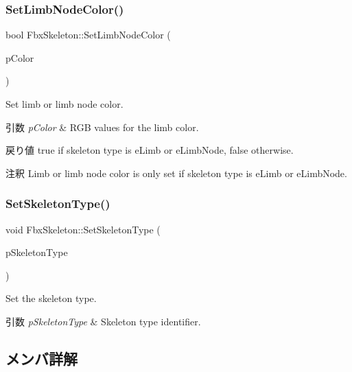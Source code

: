 \subsubsection{\texorpdfstring{Set\+Limb\+Node\+Color()}{SetLimbNodeColor()}}
{\footnotesize\ttfamily bool Fbx\+Skeleton\+::\+Set\+Limb\+Node\+Color (\begin{DoxyParamCaption}\item[{const \hyperlink{class_fbx_color}{Fbx\+Color} \&}]{p\+Color }\end{DoxyParamCaption})}

Set limb or limb node color. 
\begin{DoxyParams}{引数}
{\em p\+Color} & R\+GB values for the limb color. \\
\hline
\end{DoxyParams}
\begin{DoxyReturn}{戻り値}
{\ttfamily true} if skeleton type is {\ttfamily e\+Limb} or {\ttfamily e\+Limb\+Node}, {\ttfamily false} otherwise. 
\end{DoxyReturn}
\begin{DoxyRemark}{注釈}
Limb or limb node color is only set if skeleton type is {\ttfamily e\+Limb} or {\ttfamily e\+Limb\+Node}. 
\end{DoxyRemark}
\mbox{\label{class_fbx_skeleton_af74812971091ce9ece00a145d6f35d48}} 
\subsubsection{\texorpdfstring{Set\+Skeleton\+Type()}{SetSkeletonType()}}
{\footnotesize\ttfamily void Fbx\+Skeleton\+::\+Set\+Skeleton\+Type (\begin{DoxyParamCaption}\item[{\hyperlink{class_fbx_skeleton_ae067f8fec201e5e3572f039e37ee1c6b}{E\+Type}}]{p\+Skeleton\+Type }\end{DoxyParamCaption})}

Set the skeleton type. 
\begin{DoxyParams}{引数}
{\em p\+Skeleton\+Type} & Skeleton type identifier. \\
\hline
\end{DoxyParams}


\subsection{メンバ詳解}
\mbox{\label{class_fbx_skeleton_ac86811d94d673bbc1558eca1066311a2}} 
